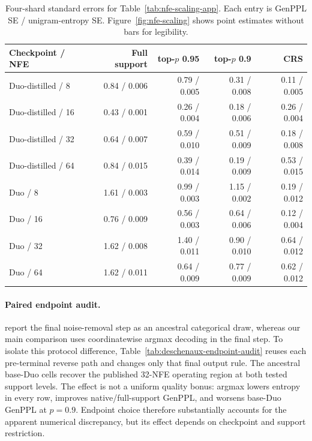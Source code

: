 \documentclass{article}
\newcommand{\1}{\mathbf 1}
\theoremstyle{definition}
\begin{document}
\begin{table}[H]
\centering
\small
\setlength{\tabcolsep}{3.5pt}
\begin{tabular}{@{}lrrrr@{}}
\toprule
Checkpoint / NFE & Full support & top-$p$ 0.95 & top-$p$ 0.9 & CRS \\
\midrule
Duo-distilled / 8  & 0.84 / 0.006 & 0.79 / 0.005 & 0.31 / 0.008 & 0.11 / 0.005 \\
Duo-distilled / 16 & 0.43 / 0.001 & 0.26 / 0.004 & 0.18 / 0.006 & 0.26 / 0.004 \\
Duo-distilled / 32 & 0.64 / 0.007 & 0.59 / 0.010 & 0.51 / 0.009 & 0.18 / 0.008 \\
Duo-distilled / 64 & 0.84 / 0.015 & 0.39 / 0.014 & 0.19 / 0.009 & 0.53 / 0.015 \\
\midrule
Duo / 8  & 1.61 / 0.003 & 0.99 / 0.003 & 1.15 / 0.002 & 0.19 / 0.012 \\
Duo / 16 & 0.76 / 0.009 & 0.56 / 0.003 & 0.64 / 0.006 & 0.12 / 0.004 \\
Duo / 32 & 1.62 / 0.008 & 1.40 / 0.011 & 0.90 / 0.010 & 0.64 / 0.012 \\
Duo / 64 & 1.62 / 0.011 & 0.64 / 0.009 & 0.77 / 0.009 & 0.62 / 0.012 \\
\bottomrule
\end{tabular}
\caption{Four-shard standard errors for Table~\ref{tab:nfe-scaling-app}.
Each entry is GenPPL SE / unigram-entropy SE. Figure~\ref{fig:nfe-scaling}
shows point estimates without bars for legibility.}
\label{tab:nfe-scaling-se-app}
\end{table}

\paragraph{Paired endpoint audit.}
\mbox{\citet{deschenaux2026psi}} report the final
noise-removal step as an ancestral categorical draw, whereas our main comparison
uses coordinatewise argmax decoding in the final step. To isolate this protocol
difference, Table~\ref{tab:deschenaux-endpoint-audit} reuses each pre-terminal
reverse path and changes only that final output rule. The ancestral base-Duo cells recover the published 32-NFE
operating region at both tested support levels. The effect is not a uniform
quality bonus: argmax lowers entropy in every row, improves native/full-support
GenPPL, and worsens base-Duo GenPPL at $p=0.9$. Endpoint choice therefore
substantially accounts for the apparent numerical discrepancy, but its effect
depends on checkpoint and support restriction.
\end{document}

